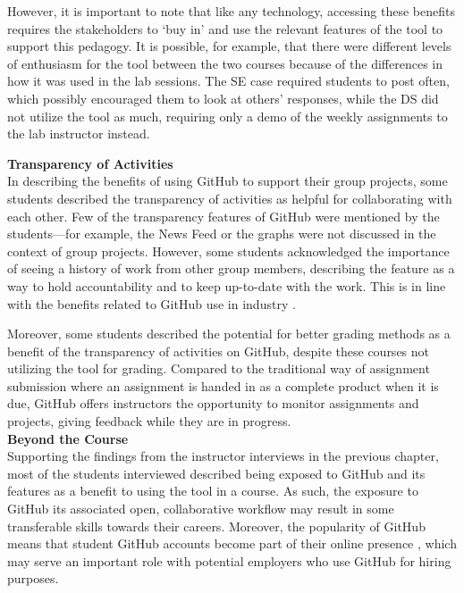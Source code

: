 However, it is important to note that like any technology, accessing these benefits requires the stakeholders to `buy in' and use the relevant features of the tool to support this pedagogy. It is possible, for example, that there were different levels of enthusiasm for the tool between the two courses because of the differences in how it was used in the lab sessions. The SE case required students to post often, which possibly encouraged them to look at others' responses, while the DS did not utilize the tool as much, requiring only a demo of the weekly assignments to the lab instructor instead.

\textbf{Transparency of Activities} \\
In describing the benefits of using GitHub to support their group projects, some students described the transparency of activities as helpful for collaborating with each other. Few of the transparency features of GitHub were mentioned by the students---for example, the News Feed or the graphs were not discussed in the context of group projects. However, some students acknowledged the importance of seeing a history of work from other group members, describing the feature as a way to hold accountability and to keep up-to-date with the work. This is in line with the benefits related to GitHub use in industry \cite{dabbish2012social}.

Moreover, some students described the potential for better grading methods as a benefit of the transparency of activities on GitHub, despite these courses not utilizing the tool for grading. Compared to the traditional way of assignment submission where an assignment is handed in as a complete product when it is due, GitHub offers instructors the opportunity to monitor assignments and projects, giving feedback while they are in progress. \\

\textbf{Beyond the Course} \\
Supporting the findings from the instructor interviews in the previous chapter, most of the students interviewed described being exposed to GitHub and its features as a benefit to using the tool in a course. As such, the exposure to GitHub its associated open, collaborative workflow may result in some transferable skills towards their careers. Moreover, the popularity of GitHub means that student GitHub accounts become part of their online presence \cite{treude2012programming}, which may serve an important role with potential employers who use GitHub for hiring purposes.

